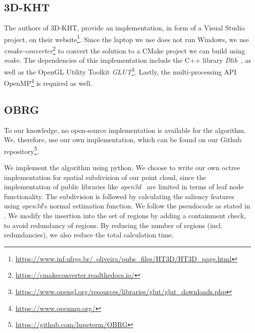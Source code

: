 \documentclass[main.tex]{subfiles}
\begin{document}
\subsection{3D-KHT}

The authors of 3D-KHT, provide an implementation, in form of a Visual Studio project, on their website\footnote{\href{https://www.inf.ufrgs.br/~oliveira/pubs_files/HT3D/HT3D_page.html}
    {https://www.inf.ufrgs.br/~oliveira/pubs\_files/HT3D/HT3D\_page.html}}. Since the laptop we use does not run Windows, we use \textit{cmake-converter}\footnote{\href{https://cmakeconverter.readthedocs.io/en/latest/use.html}{https://cmakeconverter.readthedocs.io/}} to convert
the solution to a CMake project we can build using \textit{make}. The dependencies of this implementation include the C++ library \textit{Dlib}~\cite{dlib09}, as well as the OpenGL Utility Toolkit 
\textit{GLUT}\footnote{\href{https://www.opengl.org/resources/libraries/glut/glut\_downloads.php}{https://www.opengl.org/resources/libraries/glut/glut\_downloads.php}}. 
Lastly, the multi-processing API OpenMP\footnote{\href{https://www.openmp.org/}{https://www.openmp.org/}} is required as well.

\subsection{OBRG}
\label{sec:impl-obrg}
To our knowledge, no open-source implementation is available for the algorithm.
We, therefore, use our own implementation, which can be found on our Github repository\footnote{\href{https://github.com/lupeterm/OBRG}{https://github.com/lupeterm/OBRG}}.

We implement the algorithm using python. We choose to write our own octree implementation for spatial subdivision of our point cloud, since
the implementation of public libraries like \textit{open3d}~\cite{Zhou2018} are limited in terms of leaf node functionality.
The subdivision is followed by calculating the saliency features using \textit{open3d}'s normal estimation function.
We follow the pseudocode as stated in \cite[Algorithm~1]{Vo_Truong-Hong_Laefer_Bertolotto_2015}. We modify the insertion into the set
of regions by adding a containment check, to avoid redundancy of regions. By reducing the number of regions (incl. redundancies), we also
reduce the total calculation time.

\end{document}
